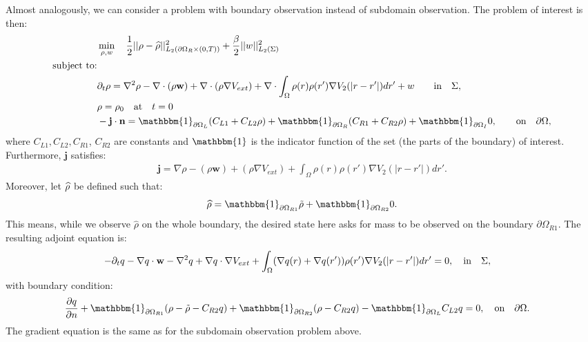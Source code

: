 
Almost analogously, we can consider a problem with boundary observation instead of subdomain observation.
The problem of interest is then:
\begin{align*}
&\min_{\Sta, w} \quad \frac{1}{2}|| \Sta -\widehat \Sta||^2_{L_2(\partial \Omega_R \times (0,T))} + \frac{\beta}{2}||w||^2_{L_2(\Sigma)}\\
\text{subject to:}\\
&\partial_t \rho = \nabla^2 \rho - \nabla \cdot (\rho \mathbf{w}) +\nabla \cdot (\rho \nabla V_{ext}) + \nabla \cdot \int_\Omega \rho(r) \rho(r') \nabla V_2(|r-r'|) dr' + w \quad  \quad\text{in} \quad \Sigma,\notag\\
& \rho = \rho_0 \quad \text{at} \quad t=0 \notag\\
& - \mathbf{j} \cdot \nor = \mathbbm{1}_{\partial \Omega_L}( C_{L1}  + C_{L2}\Sta) +\mathbbm{1}_{\partial \Omega_R} ( C_{R1}  + C_{R2}\Sta) +\mathbbm{1}_{\partial \Omega_I} 0, \quad  \quad\text{on} \quad \partial \Omega, 
\end{align*}
where $C_{L1}, C_{L2}, C_{R1}$, $C_{R2}$ are constants and $\mathbbm{1}$ is the indicator function of the set (the parts of the boundary) of interest.
Furthermore, $\mathbf{j}$ satisfies:
\begin{align*}
\mathbf{j}=\nabla \rho - (\rho \mathbf{w}) +(\rho \nabla V_{ext}) +  \int_\Omega \rho(r) \rho(r') \nabla V_2(|r-r'|) dr'.
\end{align*}
Moreover, let $\widehat {\rho}$ be defined such that:
\begin{align*}
\widehat \Sta = \mathbbm{1}_{\partial \Omega_{R1}} \tilde \Sta  +\mathbbm{1}_{\partial \Omega_{R2}} 0.
\end{align*}
This means, while we observe $\widehat \rho$ on the whole boundary, the desired state here asks for mass to be observed on the boundary $\partial \Omega_{R1}$.
The resulting adjoint equation is:
\begin{align*}
- \partial_t  q  - \nabla q \cdot \mathbf{w} - \nabla^2 q \notag 
+  \nabla q \cdot \nabla V_{ext}  \notag 
+ \int_\Omega (\nabla  q(r)+\nabla  q(r')) \rho(r') \nabla V_2(|r-r'|) dr' &=0, \quad \text{in} \quad \Sigma, 
\end{align*}
with boundary condition:
\begin{align*}
\frac{\partial \Adjb }{\partial n}+ \mathbbm{1}_{\partial \Omega_{R1}}(\rho- \tilde{\rho} -C_{R2} \Adjb) + \mathbbm{1}_{\partial \Omega_{R2}} (\Sta-C_{R2} \Adjb) - \mathbbm{1}_{\partial \Omega_L} C_{L2} \Adjb   &=0, \quad \text{on} \quad \partial \Omega.
\end{align*}
The gradient equation is the same as for the subdomain observation problem above.
